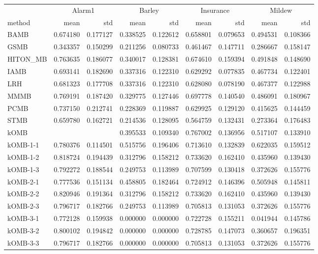 \begin{tabular}{lrrrrrrrr}
\toprule
{} & \multicolumn{2}{c}{Alarm1} & \multicolumn{2}{c}{Barley} & \multicolumn{2}{c}{Insurance} & \multicolumn{2}{c}{Mildew} \\
method & mean & std & mean & std & mean & std & mean & std \\
\midrule
BAMB & 0.674180 & 0.177127 & 0.338525 & 0.122612 & 0.658801 & 0.079653 & 0.494531 & 0.108366 \\
GSMB & 0.343357 & 0.150299 & 0.211256 & 0.080733 & 0.461467 & 0.147711 & 0.286667 & 0.158147 \\
HITON\_MB & 0.763635 & 0.186077 & 0.340017 & 0.128381 & 0.674610 & 0.159394 & 0.491848 & 0.148690 \\
IAMB & 0.693141 & 0.182690 & 0.337316 & 0.122310 & 0.629292 & 0.077835 & 0.467734 & 0.122401 \\
LRH & 0.681323 & 0.177708 & 0.337316 & 0.122310 & 0.628080 & 0.078190 & 0.467377 & 0.122988 \\
MMMB & 0.769191 & 0.187420 & 0.329775 & 0.127446 & 0.697778 & 0.140540 & 0.486091 & 0.180967 \\
PCMB & 0.737150 & 0.212741 & 0.228369 & 0.119887 & 0.629925 & 0.129120 & 0.415625 & 0.144459 \\
STMB & 0.659780 & 0.162721 & 0.214536 & 0.128095 & 0.564759 & 0.132431 & 0.273364 & 0.176483 \\
kOMB &  &  & 0.395533 & 0.109340 & 0.767002 & 0.136956 & 0.517107 & 0.133910 \\
kOMB-1-1 & 0.780376 & 0.114501 & 0.515756 & 0.196406 & 0.713610 & 0.132839 & 0.622035 & 0.159512 \\
kOMB-1-2 & 0.818724 & 0.194439 & 0.312796 & 0.158212 & 0.733620 & 0.162410 & 0.435960 & 0.139430 \\
kOMB-1-3 & 0.792272 & 0.188544 & 0.249753 & 0.113989 & 0.707599 & 0.130418 & 0.372626 & 0.155776 \\
kOMB-2-1 & 0.777536 & 0.151134 & 0.458805 & 0.182464 & 0.724912 & 0.146396 & 0.505948 & 0.145811 \\
kOMB-2-2 & 0.820946 & 0.191364 & 0.312796 & 0.158212 & 0.733620 & 0.162410 & 0.435960 & 0.139430 \\
kOMB-2-3 & 0.796717 & 0.182766 & 0.249753 & 0.113989 & 0.705813 & 0.131053 & 0.372626 & 0.155776 \\
kOMB-3-1 & 0.772128 & 0.159938 & 0.000000 & 0.000000 & 0.722728 & 0.155211 & 0.041944 & 0.145786 \\
kOMB-3-2 & 0.800102 & 0.194842 & 0.000000 & 0.000000 & 0.728785 & 0.147073 & 0.360657 & 0.196351 \\
kOMB-3-3 & 0.796717 & 0.182766 & 0.000000 & 0.000000 & 0.705813 & 0.131053 & 0.372626 & 0.155776 \\
\bottomrule
\end{tabular}
